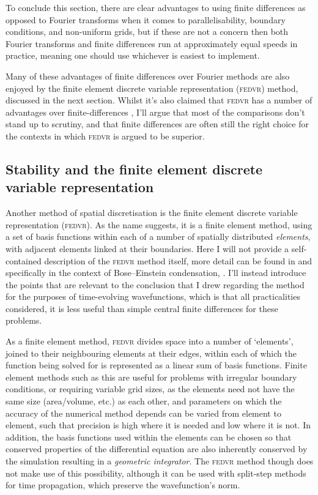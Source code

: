 To conclude this section, there are clear advantages to using finite differences as opposed to Fourier transforms when it comes to parallelisability, boundary conditions, and non-uniform grids, but if these are not a concern then both Fourier transforms and finite differences run at approximately equal speeds in practice, meaning one should use whichever is easiest to implement.

Many of these advantages of finite differences over Fourier methods are also enjoyed by the finite element discrete variable representation (\textsc{fedvr}) method, discussed in the next section. Whilst it's also claimed that \textsc{fedvr} has a number of advantages over finite-differences \cite{schneider_discrete_2005,schneider_parallel_2006}, I'll argue that most of the comparisons don't stand up to scrutiny, and that finite differences are often still the right choice for the contexts in which \textsc{fedvr} is argued to be superior.

\subsection{Stability and the finite element discrete variable representation}\label{sec:fedvr}

Another method of spatial discretisation is the finite element discrete variable representation (\textsc{fedvr}). As the name suggests, it is a finite element method, using a set of basis functions within each of a number of spatially distributed \emph{elements}, with adjacent elements linked at their boundaries. Here I will not provide a self-contained description of the \textsc{fedvr} method itself, more detail can be found in \cite[p.~285]{tannor_introduction_2007} and specifically in the context of Bose--Einstein condensation, \cite{schneider_discrete_2005,schneider_parallel_2006}. I'll instead introduce the points that are relevant to the conclusion that I drew regarding the method for the purposes of time-evolving wavefunctions, which is that all practicalities considered, it is less useful than simple central finite differences for these problems.

As a finite element method, \textsc{fedvr} divides space into a number of `elements', joined to their neighbouring elements at their edges, within each of which the function being solved for is represented as a linear sum of basis functions. Finite element methods such as this are useful for problems with irregular boundary conditions, or requiring variable grid sizes, as the elements need not have the same size (area/volume, etc.) as each other, and parameters on which the accuracy of the numerical method depends can be varied from element to element, such that precision is high where it is needed and low where it is not. In addition, the basis functions used within the elements can be chosen so that conserved properties of the differential equation are also inherently conserved by the simulation resulting in a \emph{geometric integrator}. The \textsc{fedvr} method though does not make use of this possibility, although it can be used with split-step methods for time propagation, which preserve the wavefunction's norm.

